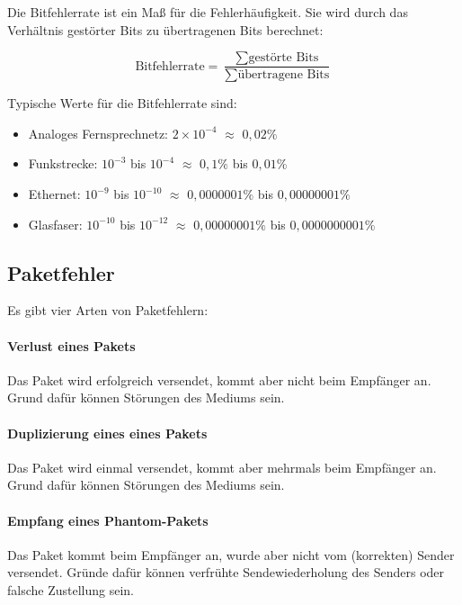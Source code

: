 \documentclass[a4paper, 14pt]{article}
\begin{document}
	Die Bitfehlerrate ist ein Maß für die Fehlerhäufigkeit.
	Sie wird durch das Verhältnis gestörter Bits zu übertragenen Bits berechnet:

	\begin{equation*}
		\text{Bitfehlerrate} = \frac{\sum \text{gestörte Bits}}{\sum \text{übertragene Bits}}
	\end{equation*}

	Typische Werte für die Bitfehlerrate sind:

	\begin{itemize}
		\item Analoges Fernsprechnetz: $2 \times 10^{-4}$ $\approx$ $0,02\%$
		\item Funkstrecke: $10^{-3}$ bis $10^{-4}$ $\approx$ $0,1\%$ bis $0,01\%$
		\item Ethernet: $10^{-9}$ bis $10^{-10}$ $\approx$ $0,0000001\%$ bis $0,00000001\%$
		\item Glasfaser: $10^{-10}$ bis $10^{-12}$ $\approx$ $0,00000001\%$ bis $0,0000000001\%$
	\end{itemize}


	\subsection{Paketfehler}

	Es gibt vier Arten von Paketfehlern:

	\paragraph{Verlust eines Pakets}

	Das Paket wird erfolgreich versendet, kommt aber nicht beim Empfänger an.
	Grund dafür können Störungen des Mediums sein.

	\paragraph{Duplizierung eines eines Pakets}

	Das Paket wird einmal versendet, kommt aber mehrmals beim Empfänger an.
	Grund dafür können Störungen des Mediums sein.

	\paragraph{Empfang eines Phantom-Pakets}

	Das Paket kommt beim Empfänger an, wurde aber nicht vom (korrekten) Sender versendet.
	Gründe dafür können verfrühte Sendewiederholung des Senders oder falsche Zustellung sein.
\end{document}
